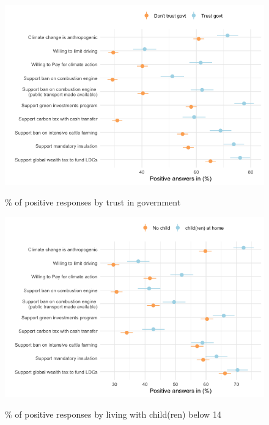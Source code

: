 	\begin{frame}{}%
	\begin{figure}[h!]
	\caption{\% of positive responses by trust in government}
	\includegraphics[width=.7\paperwidth]{../figures/FR/positive_all_by_trust_govt_FR.png} \\
	\end{figure}
	\end{frame}
	
	\begin{frame}{}%
	\begin{figure}[h!]
	\caption{\% of positive responses by living with child(ren) below 14}
	\includegraphics[width=.7\paperwidth]{../figures/FR/positive_all_by_children_FR.png} \\
	\end{figure}
	\end{frame}
	
